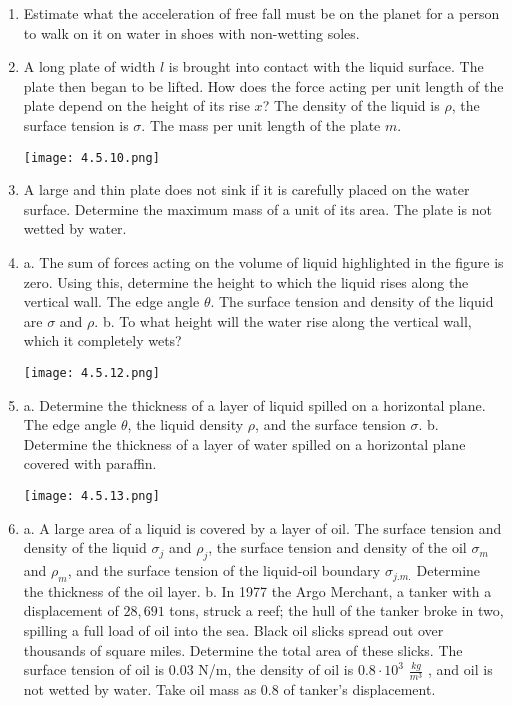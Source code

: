 \documentclass{article}
\begin{document}
\begin{enumerate}[label=4.5.\arabic*]
\item Estimate what the acceleration of free fall must be on the planet for a person to walk on it on water in shoes with non-wetting soles.   

\item A long plate of width $l$ is brought into contact with the liquid surface. The plate then began to be lifted. How does the force acting per unit length of the plate depend on the height of its rise $x$? The density of the liquid is $\rho$, the surface tension is $\sigma$. The mass per unit length of the plate $m$.

\begin{center}
    \texttt{[image: 4.5.10.png]}
\end{center}

\item A large and thin plate does not sink if it is carefully placed on the water surface. Determine the maximum mass of a unit of its area. The plate is not wetted by water.   

\item a. The sum of forces acting on the volume of liquid highlighted in the figure is zero. Using this, determine the height to which the liquid rises along the vertical wall. The edge angle $\theta$. The surface tension and density of the liquid are $\sigma$ and $\rho$. 
b. To what height will the water rise along the vertical wall, which it completely wets?   

\begin{center}
    \texttt{[image: 4.5.12.png]}
\end{center}

\item a. Determine the thickness of a layer of liquid spilled on a horizontal plane. The edge angle $\theta$, the liquid density $\rho$, and the surface tension $\sigma$. 
b. Determine the thickness of a layer of water spilled on a horizontal plane covered with paraffin. 

\begin{center}
    \texttt{[image: 4.5.13.png]}
\end{center}

\item a. A large area of a liquid is covered by a layer of oil. The surface tension and density of the liquid $\sigma_j$ and $\rho_j$, the surface tension and density of the oil $\sigma_m$ and $\rho_m$, and the surface tension of the liquid-oil boundary $\sigma_{j.m.}$ Determine the thickness of the oil layer. 
b. In 1977 the Argo Merchant, a tanker with a displacement of $28,691$ tons, struck a reef; the hull of the tanker broke in two, spilling a full load of oil into the sea. Black oil slicks spread out over thousands of square miles. Determine the total area of these slicks. The surface tension of oil is $0.03$ N/m, the density of oil is $0.8 \cdot 10^3$ $\frac{kg}{m^3}$ , and oil is not wetted by water. Take oil mass as $0.8$ of tanker's displacement.   


\end{enumerate}
\end{document}
